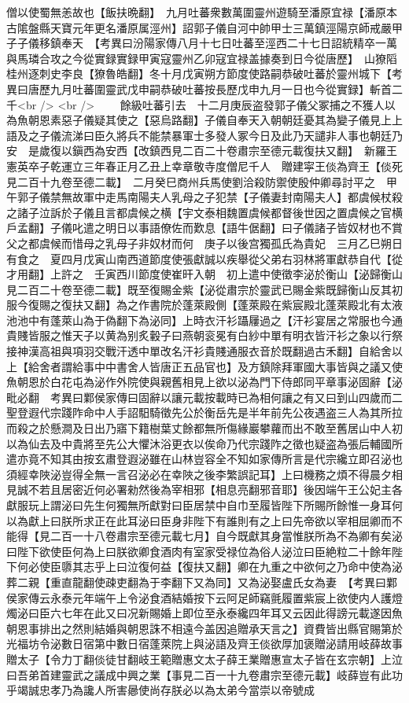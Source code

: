 僧以使蜀無恙故也【飯扶晩翻】　九月吐蕃衆數萬圍靈州遊騎至潘原宜禄【潘原本古隂盤縣天寶元年更名潘原属涇州】詔郭子儀自河中帥甲士三萬鎮涇陽京師戒嚴甲子子儀移鎮奉天　【考異曰汾陽家傳八月十七日吐蕃至涇西二十七日詔統精卒一萬與馬璘合攻之今從實録實録甲寅寇靈州乙卯寇宜禄盖據奏到日今從唐歷】　山獠䧟桂州逐刺史李良【獠魯皓翻】冬十月戊寅朔方節度使路嗣恭破吐蕃於靈州城下【考異曰唐歷九月吐蕃圍靈武戊申嗣恭破吐蕃按長歷戊申九月一日也今從實録】斬首二千<br />
<br />
　　餘級吐蕃引去　十二月庚辰盗發郭子儀父冢捕之不獲人以為魚朝恩素惡子儀疑其使之【惡烏路翻】子儀自奉天入朝朝廷憂其為變子儀見上上語及之子儀流涕曰臣久將兵不能禁暴軍士多發人冢今日及此乃天譴非人事也朝廷乃安　是歲復以鎭西為安西【改鎮西見二百二十卷肅宗至德元載復扶又翻】　新羅王憲英卒子乾運立三年春正月乙丑上幸章敬寺度僧尼千人　贈建寜王倓為齊王【倓死見二百十九卷至德二載】　二月癸巳商州兵馬使劉洽殺防禦使殷仲卿尋討平之　甲午郭子儀禁無故軍中走馬南陽夫人乳母之子犯禁【子儀妻封南陽夫人】都虞候杖殺之諸子泣訴於子儀且言都虞候之横【宇文泰相魏置虞候都督後世因之置虞候之官横戶孟翻】子儀叱遣之明日以事語僚佐而歎息【語牛倨翻】曰子儀諸子皆奴材也不賞父之都虞候而惜母之乳母子非奴材而何　庚子以後宫獨孤氏為貴妃　三月乙巳朔日有食之　夏四月戊寅山南西道節度使張獻誠以疾舉從父弟右羽林將軍獻恭自代【從才用翻】上許之　壬寅西川節度使崔旰入朝　初上遣中使徵李泌於衡山【泌歸衡山見二百二十卷至德二載】既至復賜金紫【泌從肅宗於靈武已賜金紫既歸衡山反其初服今復賜之復扶又翻】為之作書院於蓬萊殿側【蓬萊殿在紫宸殿北蓬萊殿北有太液池池中有蓬萊山為于偽翻下為泌同】上時衣汗衫躡屨過之【汗衫宴居之常服也今通貴賤皆服之惟天子以黄為别炙轂子曰燕朝衮冕有白紗中單有明衣皆汗衫之象以行祭接神漢高祖與項羽交戰汗透中單改名汗衫貴賤通服衣音於既翻過古禾翻】自給舍以上【給舍者謂給事中中書舍人皆唐正五品官也】及方鎮除拜軍國大事皆與之議又使魚朝恩於白花屯為泌作外院使與親舊相見上欲以泌為門下侍郎同平章事泌固辭【泌毗必翻　考異曰鄴侯家傳曰固辭以讓元載按載時已為相何讓之有又曰到山四歲而二聖登遐代宗踐阼命中人手詔馹騎徵先公於衡岳先是半年前先公夜遇盗三人為其所拉而殺之於懸澗及日出乃寤下籍樹葉丈餘都無所傷緣巖攀蘿而出不敢至舊居山中人初以為仙去及中貴將至先公大懼沐浴更衣以俟命乃代宗踐阼之徵也疑盗為張后輔國所遣亦竟不知其由按玄肅登遐泌雖在山林豈容全不知如家傳所言是代宗纔立即召泌也須經幸陜泌豈得全無一言召泌必在幸陜之後李繁誤記耳】上曰機務之煩不得晨夕相見誠不若且居密近何必署勑然後為宰相邪【相息亮翻邪音耶】後因端午王公妃主各獻服玩上謂泌曰先生何獨無所獻對曰臣居禁中自巾至履皆陛下所賜所餘惟一身耳何以為獻上曰朕所求正在此耳泌曰臣身非陛下有誰則有之上曰先帝欲以宰相屈卿而不能得【見二百一十八卷肅宗至德元載七月】自今既獻其身當惟朕所為不為卿有矣泌曰陛下欲使臣何為上曰朕欲卿食酒肉有室家受禄位為俗人泌泣曰臣絶粒二十餘年陛下何必使臣隳其志乎上曰泣復何益【復扶又翻】卿在九重之中欲何之乃命中使為泌葬二親【重直龍翻使疎吏翻為于李翻下又為同】又為泌娶盧氏女為妻　【考異曰鄴侯家傳云永泰元年端午上令泌食酒結婚按下云阿足師竊氈履置紫宸上欲使内人護燈燭泌曰臣六七年在此又曰况新賜婚上即位至永泰纔四年耳又云因此得謗元載遂因魚朝恩事排出之然則結婚與朝恩誅不相遠今盖因追贈承天言之】資費皆出縣官賜第於光福坊令泌數日宿第中數日宿蓬萊院上與泌語及齊王倓欲厚加褒贈泌請用岐薛故事贈太子【令力丁翻倓徒甘翻岐王範贈惠文太子薛王業贈惠宣太子皆在玄宗朝】上泣曰吾弟首建靈武之議成中興之業【事見二百一十九卷肅宗至德元載】岐薛豈有此功乎竭誠忠孝乃為讒人所害曏使尚存朕必以為太弟今當崇以帝號成